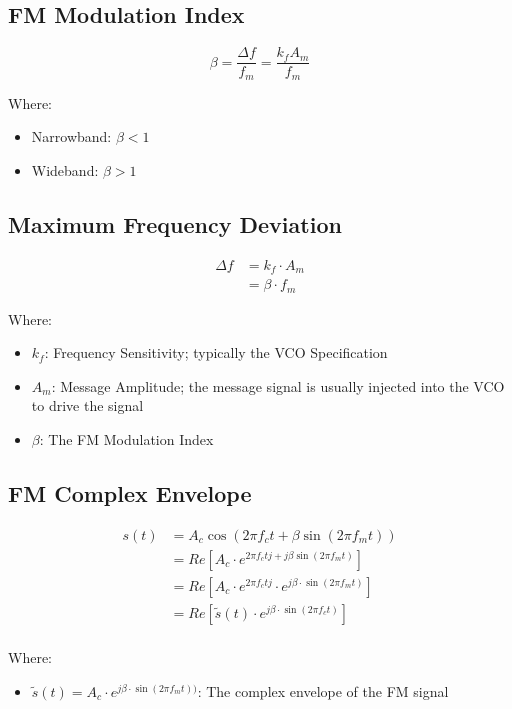 \documentclass[10pt]{article}
\begin{document}
\subsection{FM Modulation Index}
\[
	\beta = \frac{\Delta f}{f_m} = \frac{k_f A_m}{f_m}
\]

\noindent Where:
\begin{itemize}
	\item Narrowband: \( \beta < 1 \)
	\item Wideband: \( \beta > 1 \)
\end{itemize}

\subsection{Maximum Frequency Deviation}
\begin{align*}
	\Delta f & = k_f \cdot A_m   \\
	         & = \beta \cdot f_m
\end{align*}

\noindent Where:
\begin{itemize}
	\item $k_f$: Frequency Sensitivity; typically the VCO Specification
	\item $A_m$: Message Amplitude; the message signal is usually injected into the VCO to drive the signal
	\item $\beta$: The FM Modulation Index
\end{itemize}

\subsection{FM Complex Envelope}
\begin{align*}
	s(t) & = A_c \cos(2\pi f_c t + \beta \sin(2 \pi f_m t))                                 \\
	     & = Re\left[A_c \cdot e^{2\pi f_c tj + j\beta\sin(2\pi f_m t)}\right]              \\
	     & = Re\left[A_c \cdot e^{2\pi f_c tj} \cdot e^{j\beta\cdot\sin(2\pi f_m t)}\right] \\
	     & = Re\left[\tilde{s}(t)\cdot e^{j\beta\cdot\sin(2\pi f_c t)}\right]               \\
\end{align*}

\noindent Where:
\begin{itemize}
	\item $\tilde{s}(t) = A_c \cdot e^{j \beta\cdot\sin(2\pi f_m t))}$: The complex envelope of the FM signal
\end{itemize}
\end{document}
